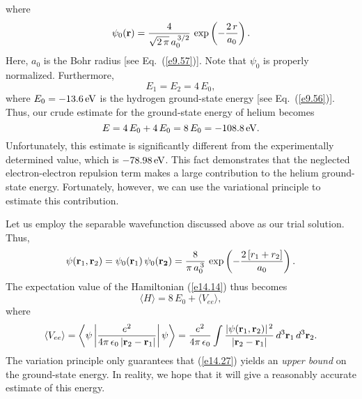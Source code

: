 where
\begin{equation}
\psi_0({\bf r}) = \frac{4}{\sqrt{2\,\pi}\,a_0^{\,3/2}}\,\exp\left(-\frac{2\,r}{a_0}\right).
\end{equation}
Here, $a_0$ is the Bohr radius [see Eq.~(\ref{e9.57})]. Note that $\psi_0$ is properly normalized. Furthermore,
\begin{equation}
E_1=E_2 = 4\,E_0,
\end{equation}
where $E_0=-13.6\,{\rm eV}$ is the hydrogen ground-state
energy [see Eq.~(\ref{e9.56})]. Thus, our crude estimate
for the ground-state energy of helium becomes
\begin{equation}
E = 4\,E_0 + 4\,E_0 = 8\,E_0 = -108.8\,{\rm eV}.
\end{equation}
Unfortunately, this estimate is significantly different from  the experimentally
determined value, which is $-78.98\,{\rm eV}$. This fact
demonstrates that the neglected electron-electron repulsion term makes a
large contribution to the helium ground-state energy.
Fortunately, however, we can  use the variational principle to estimate this contribution.

Let us employ the separable wavefunction discussed above as our trial
solution. Thus,
\begin{equation}\label{e14.26}
\psi({\bf r}_1, {\bf r}_2) = \psi_0({\bf r}_1)\,\psi_0({\bf r_2}) = 
\frac{8}{\pi\,a_0^{\,3}}\,\exp\left(- \frac{2\,[r_1+r_2]}{a_0}\right).
\end{equation}
The expectation value of the Hamiltonian (\ref{e14.14}) thus becomes
\begin{equation}\label{e14.27}
\langle H\rangle = 8\,E_0 + \langle V_{ee}\rangle,
\end{equation}
where
\begin{equation}\label{e14.28}
\langle V_{ee}\rangle = \left\langle \psi\left|\frac{e^2}{4\pi\,\epsilon_0\,|{\bf r}_2-{\bf r}_1|}\right|\psi\right\rangle= \frac{e^2}{4\pi\,\epsilon_0}
\int \frac{|\psi({\bf r}_1, {\bf r}_2)|^{\,2}}{|{\bf r}_2- {\bf r}_1|}\,d^3{\bf r}_1\,d^3{\bf r}_2.
\end{equation}
The variation principle only guarantees that (\ref{e14.27}) yields an
{\em upper bound}\/ on the ground-state energy. In reality, we hope
that it will give a reasonably accurate estimate of this energy.


